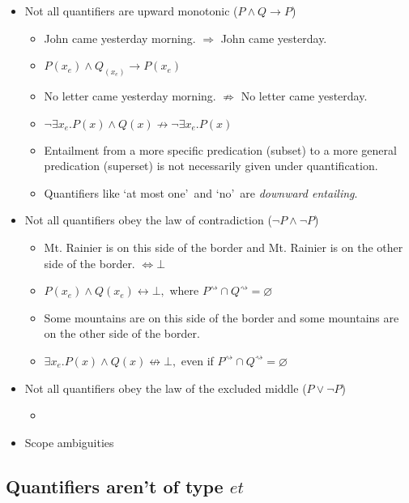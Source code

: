 \documentclass[a4paper]{article}
\begin{document}
\begin{itemize}
  \item Not all quantifiers are upward monotonic ($P \land Q \rightarrow P$)
  \begin{itemize}
    \item John came yesterday morning. $\Rightarrow$ John came yesterday.
    \item $P(x_e) \land Q_(x_e) \rightarrow P(x_e)$
    \item No letter came yesterday morning. $\not\Rightarrow$ No letter came yesterday.
    \item $\neg\exists x_e.P(x) \land Q(x) \not\rightarrow \neg\exists x_e.P(x)$
    \item Entailment from a more specific predication (subset) to a more general predication (superset) is not necessarily given under quantification.
    \item Quantifiers like \lq at most one\rq\ and \lq no\rq\ are \emph{downward entailing}.
  \end{itemize}

  \item Not all quantifiers obey the law of contradiction ($\neg P \land \neg P$)
  \begin{itemize}
    \item Mt. Rainier is on this side of the border and Mt. Rainier is on the other side of the border. $\Leftrightarrow \bot$
    \item $P(x_e) \land Q(x_e) \leftrightarrow \bot,$ where $P^\rightsquigarrow \cap Q^\rightsquigarrow = \varnothing$
    \item Some mountains are on this side of the border and some mountains are on the other side of the border.
    \item $\exists x_e.P(x) \land Q(x) \not \leftrightarrow \bot,$ even if $P^\rightsquigarrow \cap Q^\rightsquigarrow = \varnothing$
  \end{itemize}

  \item Not all quantifiers obey the law of the excluded middle ($P \lor \neg P$)

  \begin{itemize}
    \item
  \end{itemize}

  \item Scope ambiguities
\end{itemize}

\subsection{Quantifiers aren't of type $et$}
\end{document}
